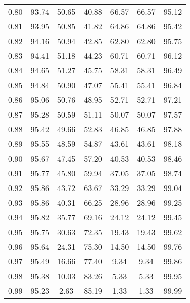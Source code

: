 \begin{tabular}{|c|c|c|c|c|c|c|}
      0.80 &     93.74 &     50.65 &      40.88 &   66.57 &      66.57 &         95.12 \\
      0.81 &     93.95 &     50.85 &      41.82 &   64.86 &      64.86 &         95.42 \\
      0.82 &     94.16 &     50.94 &      42.85 &   62.80 &      62.80 &         95.75 \\
      0.83 &     94.41 &     51.18 &      44.23 &   60.71 &      60.71 &         96.12 \\
      0.84 &     94.65 &     51.27 &      45.75 &   58.31 &      58.31 &         96.49 \\
      0.85 &     94.84 &     50.90 &      47.07 &   55.41 &      55.41 &         96.84 \\
      0.86 &     95.06 &     50.76 &      48.95 &   52.71 &      52.71 &         97.21 \\
      0.87 &     95.28 &     50.59 &      51.11 &   50.07 &      50.07 &         97.57 \\
      0.88 &     95.42 &     49.66 &      52.83 &   46.85 &      46.85 &         97.88 \\
      0.89 &     95.55 &     48.59 &      54.87 &   43.61 &      43.61 &         98.18 \\
      0.90 &     95.67 &     47.45 &      57.20 &   40.53 &      40.53 &         98.46 \\
      0.91 &     95.77 &     45.80 &      59.94 &   37.05 &      37.05 &         98.74 \\
      0.92 &     95.86 &     43.72 &      63.67 &   33.29 &      33.29 &         99.04 \\
      0.93 &     95.86 &     40.31 &      66.25 &   28.96 &      28.96 &         99.25 \\
      0.94 &     95.82 &     35.77 &      69.16 &   24.12 &      24.12 &         99.45 \\
      0.95 &     95.75 &     30.63 &      72.35 &   19.43 &      19.43 &         99.62 \\
      0.96 &     95.64 &     24.31 &      75.30 &   14.50 &      14.50 &         99.76 \\
      0.97 &     95.49 &     16.66 &      77.40 &    9.34 &       9.34 &         99.86 \\
      0.98 &     95.38 &     10.03 &      83.26 &    5.33 &       5.33 &         99.95 \\
      0.99 &     95.23 &      2.63 &      85.19 &    1.33 &       1.33 &         99.99 \\
\bottomrule
\end{tabular}
